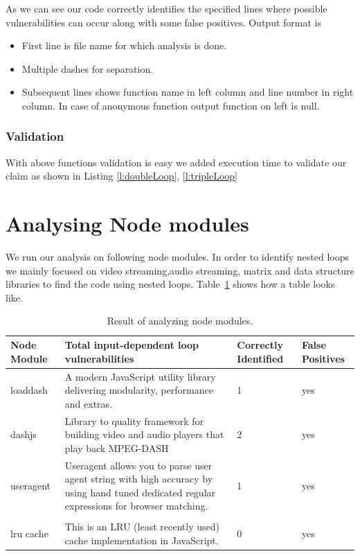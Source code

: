 \documentclass[authoryear,preprint]{sigplanconf}
\begin{document}
As we can see our code correctly identifies the specified lines where possible vulnerabilities can occur along with some false positives.
Output format is
\begin{itemize}
\item First line is file name for which analysis is done.
\item Multiple dashes for separation.
\item Subsequent lines shows function name in left column and line number in right column. In case of anonymous function output function on left is null.

\end{itemize}

\subsubsection{Validation}
With above functions validation is easy we added execution time to validate our claim as shown in Listing \ref{l:doubleLoop}, \ref{l:tripleLoop}

\section{Analysing Node modules}
We run our analysis on following node modules. In order to identify nested loops we mainly focused on video streaming,audio streaming, matrix and data structure libraries to find the code using nested loops.
Table~\ref{t:Comparison} shows how a table looks like.

\begin{table}[h]
\small
\begin{tabular}{ |p{1.9cm}||p{1.9cm}|p{1.9cm}|p{1.9cm}|  }
 \hline
 \textbf{Node Module}&\textbf{Total input-dependent loop vulnerabilities}&\textbf{Correctly Identified} &\textbf{False Positives}\\
 \hline
loaddash&A modern JavaScript utility library delivering modularity, performance and extras.&1 &yes  \\
\hline 
dashjs &Library to quality framework for building video and audio players that play back MPEG-DASH&2&yes  \\
\hline 
useragent &Useragent allows you to parse user agent string with high accuracy by using hand tuned dedicated regular expressions for browser matching. &1 &yes  \\
\hline \\
 lru cache & This is an LRU (least recently used) cache implementation in JavaScript.&0 &yes \\
\hline 

\end{tabular}

\caption[Comparison]{\label{t:Comparison} Result of analyzing node modules.}
\end{table}
\end{document}
